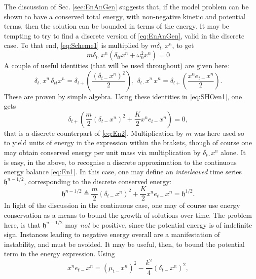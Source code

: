 \documentclass[11pt,twoside,a4paper,english]{book}
\newcommand{\etm}{e_{t-}}
\newcommand{\dtp}{\delta_{t+}}
\newcommand{\dtm}{\delta_{t-}}
\newcommand{\dtd}{\delta_{t\cdot}}
\newcommand{\dtt}{\delta_{tt}}
\newcommand{\mtm}{\mu_{t-}}
\begin{document}
The discussion of Sec. \ref{sec:EnAnGen} suggests that, if the model problem can be shown to have a conserved total energy, with non-negative kinetic and potential terms, then the solution can be bounded in terms of the energy. It may be tempting to try to find a discrete version of \eqref{eq:EnAnGen}, valid in the discrete case. To that end, \eqref{eq:Scheme1} is multiplied by $m \dtd x^n$, to get
\begin{equation}\label{eq:SHOen1}
    m \dtd x^n (\dtt x^n +\omega_0^2 x^n) = 0
\end{equation}
A couple of useful identities (that will be used throughout) are given here:
\begin{equation}\label{eq:IdsFD}
    \dtd x^n \, \dtt x^n = \dtp \left( \frac{(\dtm x^n)^2}{2}\right), \,\, \dtd x^n \, x^n = \dtp \left( \frac{x^n \etm x^n}{2}\right).
\end{equation}
These are proven by simple algebra. Using these identities in \eqref{eq:SHOen1}, one gets
\begin{equation}
    \dtp \left( \frac{m}{2}{(\dtm x^n)^2} + \frac{K}{2} {x^n \etm x^n} \right) = 0,
\end{equation} 
that is a discrete counterpart of \eqref{eq:En2}. Multiplication by $m$ was here used so to yield units of energy in the expression within the brakets, though of course one may obtain conserved energy per unit mass via multiplication by $\dtd x^n$ alone. It is easy, in the above, to recognise a discrete approximation to the continuous energy balance \eqref{eq:En1}. In this case, one may define an \emph{interleaved} time series $\mathfrak{h}^{n-1/2}$, corresponding to the discrete conserved energy:
\begin{equation}\label{eq:DiscEnSHO}
    \mathfrak{h}^{n-1/2} \triangleq \frac{m}{2}{(\dtm x^n)^2} + \frac{K}{2} {x^n \etm x^n} = \mathfrak{h}^{1/2}.
\end{equation}
In light of the discussion in the continuous case, one may of course use energy conservation as a means to bound the growth of solutions over time. The problem here, is that $\mathfrak{h}^{n-1/2}$ may \emph{not} be positive, since the potential energy is of indefinite sign. Instances leading to negative energy overall are a manifestation of instability, and must be avoided. It may be useful, then, to bound the potential term in the energy expression. Using
\begin{equation}
    x^n \etm x^n  =  (\mtm x^n)^2 - \frac{k^2}{4}\left(\dtm x^n \right)^2,
\end{equation}
\end{document}
